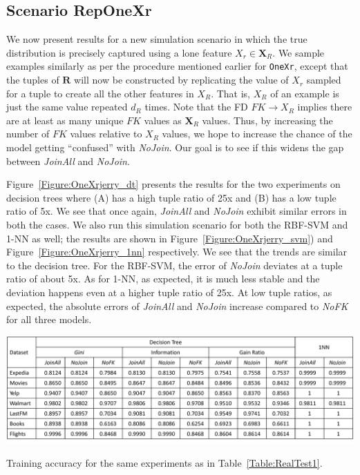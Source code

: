 \documentclass{vldb}
\begin{document}
\subsection{Scenario RepOneXr}
We now present results for a new simulation scenario in which the true distribution is precisely captured using a lone feature $X_r \in \textbf{X}_R$. We sample examples similarly as per the procedure mentioned earlier for \texttt{OneXr}, except that the tuples of $\textbf{R}$ will now be constructed by replicating the value of $X_r$ sampled for a tuple to create all the other features in $X_R$. That is, $X_R$ of an example is just the same value repeated $d_R$ times. Note that the FD $\textit{FK} \rightarrow X_R $ implies there are at least as many unique $FK$ values as $\textbf{X}_R$ values. Thus, by increasing the number of $FK$ values relative to $X_R$ values, we hope to increase the chance of the model getting ``confused'' with \textit{NoJoin}. Our goal is to see if this widens the gap between \textit{JoinAll} and \textit{NoJoin}.

Figure~\ref{Figure:OneXrjerry_dt} presents the results for the two experiments on decision trees where (A) has a high tuple ratio of 25x and (B) has a low tuple ratio of 5x. 
We see that once again, \textit{JoinAll} and \textit{NoJoin} exhibit similar errors in both the cases. We also run this simulation scenario for 
both the RBF-SVM and 1-NN as well; the results are shown in Figure~\ref{Figure:OneXrjerry_svm}) and Figure~\ref{Figure:OneXrjerry_1nn} respectively.
We see that the trends are similar to the decision tree. For the RBF-SVM, the error of \textit{NoJoin} deviates at a tuple ratio of about 5x. 
As for 1-NN, as expected, it is much less stable and the deviation happens even at a higher tuple ratio of 25x.
At low tuple ratios, as expected, the absolute errors of \textit{JoinAll} and \textit{NoJoin} increase compared to \textit{NoFK} for all three models.

\begin{table}[t]
\centering
\includegraphics[width=2\columnwidth]{table3-1.pdf}
\caption{Training accuracy for the same experiments as in Table~\ref{Table:RealTest1}.}
\label{Table:RealTrain1}
\end{table}
\end{document}
